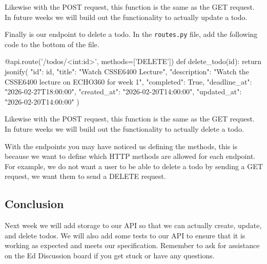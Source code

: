 \documentclass{csse4400}
\begin{document}
Likewise with the POST request, this function is the same as the GET request.
In future weeks we will build out the functionality to actually update a todo.

Finally is our endpoint to delete a todo.
In the \texttt{routes.py} file, add the following code to the bottom of the file.

\begin{code}[language=python]{}
  @api.route('/todos/<int:id>', methods=['DELETE'])
  def delete_todo(id):
      return jsonify({
        "id": id,
        "title": "Watch CSSE6400 Lecture",
        "description": "Watch the CSSE6400 lecture on ECHO360 for week 1",
        "completed": True,
        "deadline_at": "2026-02-27T18:00:00",
        "created_at": "2026-02-20T14:00:00",
        "updated_at": "2026-02-20T14:00:00"
      })
\end{code}

Likewise with the POST request, this function is the same as the GET request.
In future weeks we will build out the functionality to actually delete a todo.

With the endpoints you may have noticed us defining the methods,
this is because we want to define which HTTP methods are allowed for each endpoint.
For example, we do not want a user to be able to delete a todo by sending a GET request, we want them to send a DELETE request.

\subsection{Conclusion}
Next week we will add storage to our API so that we can actually create, update, and delete todos.
We will also add some tests to our API to ensure that it is working as expected and meets our specification.
Remember to ask for assistance on the Ed Discussion board if you get stuck or have any questions.

%
%
\end{document}
